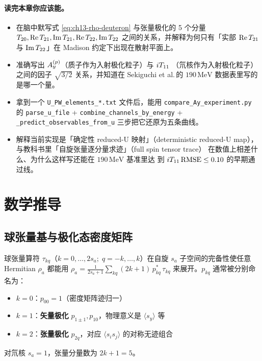 \paragraph{读完本章你应该能。}
\begin{itemize}
  \item 在脑中默写式 \eqref{eq:ch13-rho-deuteron} 与张量极化的 5 个分量
        \(\Ttwentyzero, \Re\Ttwentyone, \Im\Ttwentyone, \Re\Ttwentytwo,
        \Im\Ttwentytwo\) 之间的关系，并解释为何只有「实部 \(\Re\Ttwentyone\)
        与 \(\Im\Ttwentytwo\)」在 Madison 约定下出现在散射平面上。
  \item 准确写出 \(A_y^{(p)}\)（质子作为入射极化粒子）与 \({i T_{11}}\)
        （氘核作为入射极化粒子）之间的因子 \(\sqrt{3/2}\) 关系，并知道在
        Sekiguchi et al.\,的 \(190\,\text{MeV}\) 数据表里写的是哪一个量。
  \item 拿到一个 \texttt{U\_PW\_elements\_*.txt} 文件后，能用
        \texttt{compare\_Ay\_experiment.py} 的 \texttt{parse\_u\_file} +
        \texttt{combine\_channels\_by\_energy} +
        \texttt{\_predict\_observables\_from\_u} 三步把它还原为五条曲线。
  \item 解释当前实现是「确定性 reduced-U 映射」（deterministic reduced-U
        map），与教科书里「自旋张量逐分量求迹」（full spin tensor trace）
        在数值上相差什么、为什么这样写还能在 \(190\,\text{MeV}\) 基准里达
        到 \({i T_{11}}\,\text{RMSE} \le 0.10\) 的早期通过线。
\end{itemize}

\section{数学推导}
\label{sec:ch13-math}

\subsection{球张量基与极化态密度矩阵}
\label{subsec:ch13-spherical-tensor}

球张量算符 \(\tau_{kq}\)（\(k=0,\ldots,2 s_a;\;q=-k,\ldots,k\)）在自旋
\(s_a\) 子空间的完备性使任意 Hermitian \(\rho_a\) 都能用
\(\rho_a = \frac{1}{2 s_a + 1}\sum_{kq}(2 k + 1)\,p_{kq}^{*}\,\tau_{kq}\)
来展开。\(p_{kq}\) 通常被分别命名为：
\begin{itemize}
  \item \(k=0\)：\(p_{00} = 1\)（密度矩阵迹归一）
  \item \(k=1\)：\textbf{矢量极化} \(p_{1\pm 1}, p_{10}\)，物理意义是
        \(\langle s_y\rangle\) 等
  \item \(k=2\)：\textbf{张量极化} \(p_{2 q}\)，对应 \(\langle s_i s_j\rangle\)
        的对称无迹组合
\end{itemize}
对氘核 \(s_a = 1\)，张量分量数为 \(2k+1=5\)。


